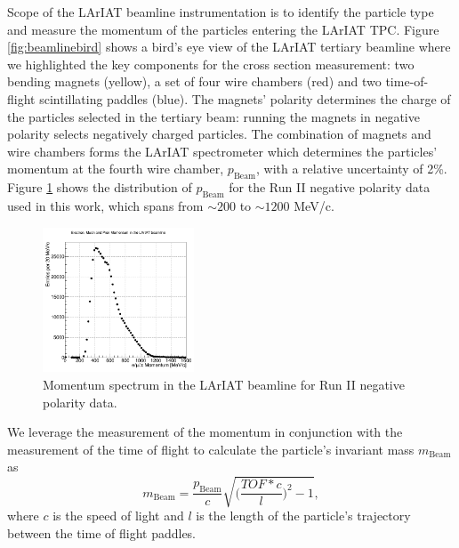 \documentclass[aps,prl,twocolumn,showpacs,superscriptaddress,groupedaddress]{revtex4}  %
\begin{document}


Scope of the LArIAT beamline instrumentation is to identify the particle type and measure the momentum of the particles entering the LArIAT TPC. Figure \ref{fig:beamlinebird} shows a bird's eye view of the LArIAT tertiary beamline where we highlighted the key components for the cross section measurement:  two bending magnets (yellow), a set of four wire chambers (red) and two time-of-flight scintillating paddles (blue).  The magnets' polarity determines the charge of the particles selected in the tertiary beam: running the magnets in negative polarity selects negatively charged particles. The combination of magnets and wire chambers forms the LArIAT spectrometer which determines the particles' momentum at the fourth wire chamber, $p_{\text{Beam}}$, with a relative uncertainty of 2\%. Figure \ref{fig:momentum} shows the distribution of  $p_{\text{Beam}}$ for the Run II negative polarity data used in this work, which spans from $\sim200$ to $\sim1200$ MeV/c. 
\begin{figure}
  \centering  
\includegraphics[width =0.4\textwidth]{momentumPiMuE.png}
\caption{Momentum spectrum in the LArIAT beamline  for Run II negative polarity data.}
\label{fig:momentum}
\end{figure}



We leverage the measurement of the momentum in conjunction with the measurement of the time of flight to calculate the particle's invariant mass $m_{\text{Beam}}$ as 
\begin{equation}
m_{\text{Beam}} = \frac{p_{\text{Beam}}}{c}\sqrt{\biggl(\frac{TOF*c}{l}\biggr)^2 -1},
\label{eq:mass}
\end{equation}
 where $c$ is the speed of light and $l$ is the length of the particle's trajectory between the time of flight paddles. 
\end{document}
